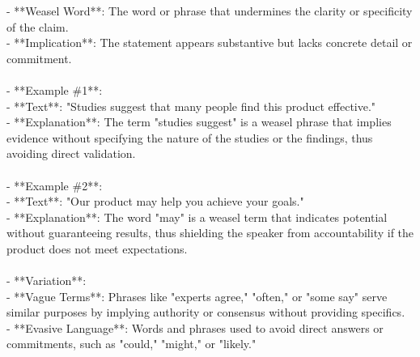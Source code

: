 \documentclass[a4paper,12pt,single,pdftex]{scrbook}
\begin{document}
    
        - **Weasel Word**: The word or phrase that undermines the clarity or specificity of the claim.
    \\

    
        - **Implication**: The statement appears substantive but lacks concrete detail or commitment.
    \\

    
      
    \\

    
      - **Example \#1**:
    \\

    
        - **Text**: "Studies suggest that many people find this product effective."
    \\

    
        - **Explanation**: The term "studies suggest" is a weasel phrase that implies evidence without specifying the nature of the studies or the findings, thus avoiding direct validation.
    \\

    
      
    \\

    
      - **Example \#2**:
    \\

    
        - **Text**: "Our product may help you achieve your goals."
    \\

    
        - **Explanation**: The word "may" is a weasel term that indicates potential without guaranteeing results, thus shielding the speaker from accountability if the product does not meet expectations.
    \\

    
      
    \\

    
      - **Variation**:
    \\

    
        - **Vague Terms**: Phrases like "experts agree," "often," or "some say" serve similar purposes by implying authority or consensus without providing specifics.
    \\

    
        - **Evasive Language**: Words and phrases used to avoid direct answers or commitments, such as "could," "might," or "likely."
    \\

    
      
\end{document}
